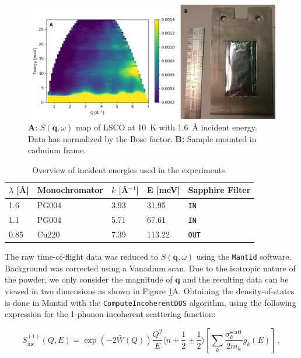 \begin{figure}
    \centering
    \includegraphics[width=\textwidth]{fig/gdos/sample_sqw.png}
    \caption[$S(\bm{q}, \omega)$ map and picture of sample]{\textbf{A}: $S(\bm{q}, \omega)$ map of LSCO at \SI{10}{K} with \SI{1.6}{\angstrom} incident energy. Data has normalized by the Bose factor. \textbf{B:} Sample mounted in cadmium frame.}
    \label{fig:sample_sqw}
\end{figure}

\begin{table}[b]
    \centering
    \begin{tabular}{lllll}\toprule
    $\lambda$ [\AA] & Monochromator  & $k$ [\AA$^{-1}$] & E [meV] & Sapphire Filter     \\ \midrule
    1.6             & PG004 & 3.93            & 31.95   & \texttt{IN}  \\
    1.1             & PG004 & 5.71            & 67.61   & \texttt{IN}  \\
    0.85            & Cu220 & 7.39            & 113.22  & \texttt{OUT} \\ \bottomrule
    \end{tabular}
    \caption[IN4: Incident energies]{Overview of incident energies used in the experiments.}
    \label{tab:in4}
\end{table}

The raw time-of-flight data was reduced to $S(\bm{q},\omega)$ using the \texttt{Mantid} \cite{Arnold2014} software. Background was corrected using a Vanadium scan. Due to the isotropic nature of the powder, we only consider the magnitude of $\bm{q}$ and the resulting data can be viewed in two dimensions as shown in Figure \ref{fig:sample_sqw}A. Obtaining the density-of-states is done in Mantid with the \texttt{ComputeIncoherentDOS} algorithm, using the following expression for the 1-phonon incoherent scattering function:

 \[ S^{(1)}_{\mathrm{inc}}(Q,E) = \exp\left(-2\bar{W}(Q)\right) \frac{Q^2}{E} \langle n+\frac{1}{2}\pm\frac{1}{2} \rangle \left[ \sum_k \frac{\sigma_k^{\mathrm{scatt}}}{2m_k} g_k(E) \right]\, , \]
 

